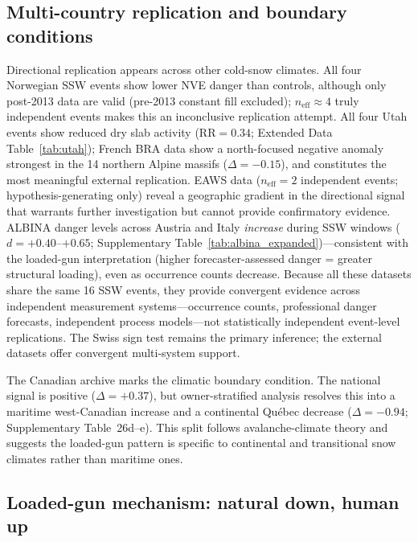 \documentclass[11pt,letterpaper]{article}
\begin{document}
\subsection*{Multi-country replication and boundary conditions}

Directional replication appears across other cold-snow climates. All four Norwegian SSW events show lower NVE danger than controls, although only post-2013 data are valid (pre-2013 constant fill excluded); $n_{\mathrm{eff}} \approx 4$ truly independent events makes this an inconclusive replication attempt. All four Utah events show reduced dry slab activity ($\mathrm{RR} = 0.34$; Extended Data Table~\ref{tab:utah}); French BRA data show a north-focused negative anomaly strongest in the 14 northern Alpine massifs ($\Delta = -0.15$)\cite{Kretschmer2018}, and constitutes the most meaningful external replication. EAWS data ($n_{\mathrm{eff}} = 2$ independent events; hypothesis-generating only) reveal a geographic gradient in the directional signal that warrants further investigation but cannot provide confirmatory evidence. ALBINA danger levels across Austria and Italy \emph{increase} during SSW windows ($d = +0.40$--$+0.65$; Supplementary Table~\ref{tab:albina_expanded})---consistent with the loaded-gun interpretation (higher forecaster-assessed danger = greater structural loading), even as occurrence counts decrease. Because all these datasets share the same 16 SSW events, they provide convergent evidence across independent measurement systems---occurrence counts, professional danger forecasts, independent process models---not statistically independent event-level replications. The Swiss sign test remains the primary inference; the external datasets offer convergent multi-system support.

The Canadian archive marks the climatic boundary condition. The national signal is positive ($\Delta = +0.37$), but owner-stratified analysis resolves this into a maritime west-Canadian increase and a continental Qu\'ebec decrease ($\Delta = -0.94$; Supplementary Table~26d--e). This split follows avalanche-climate theory\cite{McClung2006} and suggests the loaded-gun pattern is specific to continental and transitional snow climates rather than maritime ones.

\subsection*{Loaded-gun mechanism: natural down, human up}
\end{document}
